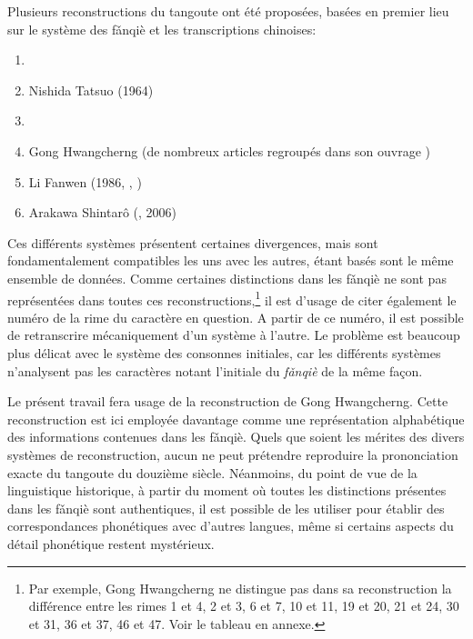 \documentclass[oldfontcommands,twoside,a4paper,11pt,draft]{memoir}
\newcommand{\ipa}[1]{{\phon #1}} %
\begin{document}
Plusieurs reconstructions du tangoute ont été proposées, basées en premier lieu sur le système des \ipa{fǎnqiè} et les transcriptions chinoises:
\begin{enumerate}
\item \citet{hashimoto63tongju}
\item Nishida Tatsuo (1964)
\item \citet{sofronov68a}
\item Gong Hwangcherng (de nombreux articles regroupés dans son ouvrage \citealt{gong02a})
\item Li Fanwen (1986, \citealt{lifw94zzz}, \citealt{lifw97})
\item Arakawa Shintarô (\citealt{arakawa01}, 2006)
\end{enumerate}
Ces différents systèmes présentent certaines divergences, mais sont fondamentalement compatibles les uns avec les autres, étant basés sont le même ensemble de données. Comme certaines distinctions dans les \ipa{fǎnqiè} ne sont pas représentées dans toutes ces reconstructions,\footnote{Par exemple, Gong Hwangcherng ne distingue pas dans sa reconstruction la différence entre les rimes 1 et 4, 2 et 3, 6 et 7, 10 et 11, 19 et 20, 21 et 24, 30 et 31, 36 et 37, 46 et 47. Voir le tableau en annexe.}  il est d'usage de citer également le numéro de la rime du caractère en question. A partir de ce numéro, il est possible de retranscrire mécaniquement d'un système à l'autre. Le problème est beaucoup plus délicat avec le système des consonnes initiales, car les différents systèmes n'analysent pas les caractères notant l'initiale du \textit{fǎnqiè} de la même façon. 

	Le présent travail fera usage de la reconstruction de Gong Hwangcherng. Cette reconstruction est ici employée davantage comme une représentation alphabétique des informations contenues dans les \ipa{fǎnqiè}. Quels que soient les mérites des divers systèmes de reconstruction, aucun ne peut prétendre reproduire la prononciation exacte du tangoute du douzième siècle. Néanmoins, du point de vue de la linguistique historique, à partir du moment où toutes les distinctions présentes dans les \ipa{fǎnqiè} sont authentiques, il est possible de les utiliser pour établir des correspondances phonétiques avec d'autres langues, même si certains aspects du détail phonétique restent mystérieux.
	
\end{document}

